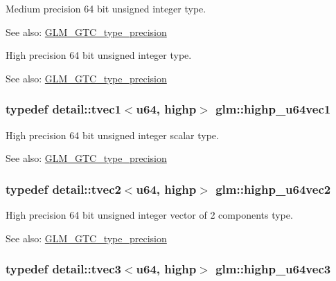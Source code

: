 Medium precision 64 bit unsigned integer type. \begin{Desc}
\item[See also:]\hyperlink{group__gtc__type__precision}{GLM\_\-GTC\_\-type\_\-precision}\end{Desc}
High precision 64 bit unsigned integer type. \begin{Desc}
\item[See also:]\hyperlink{group__gtc__type__precision}{GLM\_\-GTC\_\-type\_\-precision} \end{Desc}
\hypertarget{group__gtc__type__precision_gb48ca217e1d1cc9aac3d9f037493ae7e}{
\subsubsection[highp\_\-u64vec1]{\setlength{\rightskip}{0pt plus 5cm}typedef detail::tvec1$<$u64, highp$>$ {\bf glm::highp\_\-u64vec1}}}
\label{group__gtc__type__precision_gb48ca217e1d1cc9aac3d9f037493ae7e}


High precision 64 bit unsigned integer scalar type. \begin{Desc}
\item[See also:]\hyperlink{group__gtc__type__precision}{GLM\_\-GTC\_\-type\_\-precision} \end{Desc}
\hypertarget{group__gtc__type__precision_gd11667a4764867732a89791ec2a01aeb}{
\subsubsection[highp\_\-u64vec2]{\setlength{\rightskip}{0pt plus 5cm}typedef detail::tvec2$<$u64, highp$>$ {\bf glm::highp\_\-u64vec2}}}
\label{group__gtc__type__precision_gd11667a4764867732a89791ec2a01aeb}


High precision 64 bit unsigned integer vector of 2 components type. \begin{Desc}
\item[See also:]\hyperlink{group__gtc__type__precision}{GLM\_\-GTC\_\-type\_\-precision} \end{Desc}
\hypertarget{group__gtc__type__precision_g3cb5c038f8cba0dfb894af66b7b2ba13}{
\subsubsection[highp\_\-u64vec3]{\setlength{\rightskip}{0pt plus 5cm}typedef detail::tvec3$<$u64, highp$>$ {\bf glm::highp\_\-u64vec3}}}
\label{group__gtc__type__precision_g3cb5c038f8cba0dfb894af66b7b2ba13}


